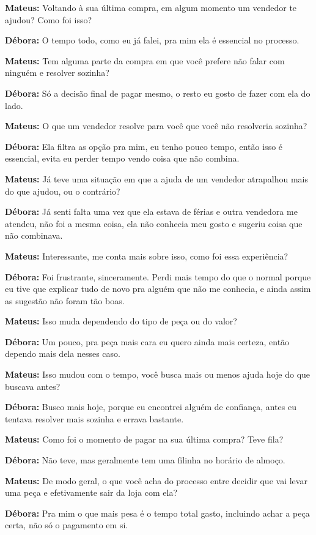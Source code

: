 \textbf{Mateus:} Voltando à sua última compra, em algum momento um vendedor te ajudou? Como foi isso?

\textbf{Débora:} O tempo todo, como eu já falei, pra mim ela é essencial no processo.

\textbf{Mateus:} Tem alguma parte da compra em que você prefere não falar com ninguém e resolver sozinha?

\textbf{Débora:} Só a decisão final de pagar mesmo, o resto eu gosto de fazer com ela do lado.

\textbf{Mateus:} O que um vendedor resolve para você que você não resolveria sozinha?

\textbf{Débora:} Ela filtra as opção pra mim, eu tenho pouco tempo, então isso é essencial, evita eu perder tempo vendo coisa que não combina.

\textbf{Mateus:} Já teve uma situação em que a ajuda de um vendedor atrapalhou mais do que ajudou, ou o contrário?

\textbf{Débora:} Já senti falta uma vez que ela estava de férias e outra vendedora me atendeu, não foi a mesma coisa, ela não conhecia meu gosto e sugeriu coisa que não combinava.

\textbf{Mateus:} Interessante, me conta mais sobre isso, como foi essa experiência?

\textbf{Débora:} Foi frustrante, sinceramente. Perdi mais tempo do que o normal porque eu tive que explicar tudo de novo pra alguém que não me conhecia, e ainda assim as sugestão não foram tão boas.

\textbf{Mateus:} Isso muda dependendo do tipo de peça ou do valor?

\textbf{Débora:} Um pouco, pra peça mais cara eu quero ainda mais certeza, então dependo mais dela nesses caso.

\textbf{Mateus:} Isso mudou com o tempo, você busca mais ou menos ajuda hoje do que buscava antes?

\textbf{Débora:} Busco mais hoje, porque eu encontrei alguém de confiança, antes eu tentava resolver mais sozinha e errava bastante.

\textbf{Mateus:} Como foi o momento de pagar na sua última compra? Teve fila?

\textbf{Débora:} Não teve, mas geralmente tem uma filinha no horário de almoço.

\textbf{Mateus:} De modo geral, o que você acha do processo entre decidir que vai levar uma peça e efetivamente sair da loja com ela?

\textbf{Débora:} Pra mim o que mais pesa é o tempo total gasto, incluindo achar a peça certa, não só o pagamento em si.

